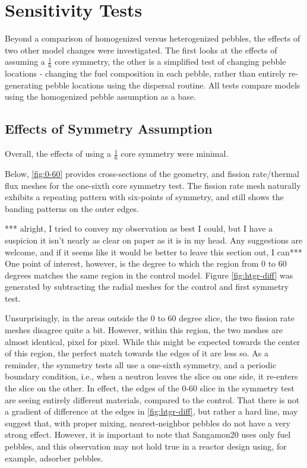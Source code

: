 \section{Sensitivity Tests}
Beyond a comparison of homogenized versus heterogenized pebbles, the effects of two other model changes were investigated.  The first looks at the effects of assuming a $\frac{1}{6}$ core symmetry, the other is a simplified test of changing pebble locations - changing the fuel composition in each pebble, rather than entirely re-generating pebble locations using the dispersal routine.  All tests compare models using the homogenized pebble assumption as a base.

\subsection{Effects of Symmetry Assumption}

Overall, the effects of using a $\frac{1}{6}$ core symmetry were minimal.




Below, \ref{fig:0-60} provides cross-sections of the geometry, and fission rate/thermal flux meshes for the one-sixth core symmetry test.  The fission rate mesh naturally exhibits a repeating pattern with six-points of symmetry, and still shows the banding patterns on the outer edges. 



*** alright, I tried to convey my observation as best I could, but I have a suspicion it isn't nearly as clear on paper as it is in my head.  Any suggestions are welcome, and if it seems like it would be better to leave this section out, I can***
One point of interest, however, is the degree to which the region from 0 to 60 degrees matches the same region in the control model.  Figure \ref{fig:htgr-diff} was generated by subtracting the radial meshes for the control and first symmetry test.



Unsurprisingly, in the areas outside the 0 to 60 degree slice, the two fission rate meshes disagree quite a bit.  However, within this region, the two meshes are almost identical, pixel for pixel.  While this might be expected towards the center of this region, the perfect match towards the edges of it are less so.  As a reminder, the symmetry tests all use a one-sixth symmetry, and a periodic boundary condition, i.e., when a neutron leaves the slice on one side, it re-enters the slice on the other.  In effect, the edges of the 0-60 slice in the symmetry test are seeing entirely different materials, compared to the control.  That there is not a gradient of difference at the edges in \ref{fig:htgr-diff}, but rather a hard line, may suggest that, with proper mixing, nearest-neighbor pebbles do not have a very strong effect.  However, it is important to note that Sangamon20 uses only fuel pebbles, and this observation may not hold true in a reactor design using, for example, adsorber pebbles. 

